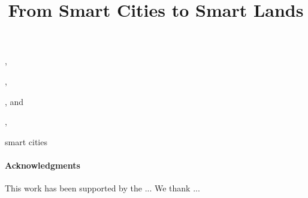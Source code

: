 \documentclass{iosart2c}
\begin{document}
\begin{frontmatter}                           %

%
\title{From Smart Cities to Smart Lands}




\author[A]{ },
\author[B]{ },
\author[B]{ },
and
\author[C]{ },
\address[A]{Universidad Tecnica Privada de Loja \\
E-mail: nopiedra@utpl.edu.ec}
\address[B]{Universidad de Cuenca\\
E-mail: \{victor.saquicela,mauricio.espinoza\}@ucuenca.edu.ec}
\address[C]{iSOCO, Avda. Parten\'on. 16-18, 28042, Madrid, Spain\\
E-mail: bvillazon@isoco.com}

\vspace{-7mm}
\begin{abstract}
\end{abstract}

\begin{keyword}
smart cities
\end{keyword}

\end{frontmatter}








\paragraph{Acknowledgments}
This work has been supported by the ...
We thank ... \\


  
\end{document}
